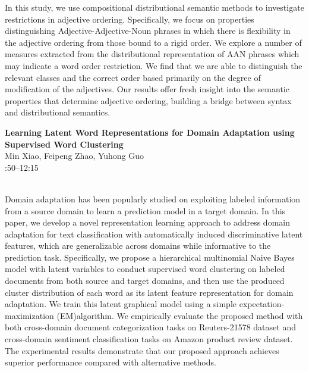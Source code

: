 \documentclass[twoside,makeidx]{book}
\renewcommand{\normalsize}{\fontsize{8}{9}\selectfont}
\renewcommand{\small}{\fontsize{7}{8}\selectfont}
\begin{document}
\nopagebreak%
\noindent%
{\small In this study, we use compositional distributional semantic methods to investigate restrictions in adjective ordering. Specifically, we focus on properties distinguishing Adjective-Adjective-Noun phrases in which there is flexibility in the adjective ordering from those bound to a rigid order. We explore a number of measures extracted from the distributional representation of AAN phrases which may indicate a word order restriction. We find that we are able to distinguish the relevant classes and the correct order based primarily on the degree of modification of the adjectives. Our results offer fresh insight into the semantic properties that determine adjective ordering, building a bridge between syntax and distributional semantics.}
\par\vspace{2em}\noindent%
\begin{minipage}{\linewidth}%
\begin{center}
\textbf{\normalsize Learning Latent Word Representations for Domain Adaptation using Supervised Word Clustering}\\
\normalsize  Min Xiao,  Feipeng Zhao,  Yuhong Guo\\
{\small 11:50--12:15}\\
\end{center}
\end{minipage}\\[0.5em]
\nopagebreak%
\noindent%
{\small Domain adaptation has been popularly studied on exploiting labeled information from a source domain to learn a prediction model in a target domain. In this paper, we develop a novel representation learning approach to address domain adaptation for text classification with automatically induced discriminative latent features, which are generalizable across domains while informative to the prediction task. Specifically, we propose a hierarchical multinomial Naive Bayes model with latent variables to conduct supervised word clustering on labeled documents from both source and target domains, and then use the produced cluster distribution of each word as its latent feature representation for domain adaptation. We train this latent graphical model using a simple expectation-maximization (EM)algorithm. We empirically evaluate the proposed method with both cross-domain document categorization tasks on Reuters-21578 dataset and cross-domain sentiment classification tasks on Amazon product review dataset. The experimental results demonstrate that our proposed approach achieves superior performance compared with alternative methods.}
\end{document}
